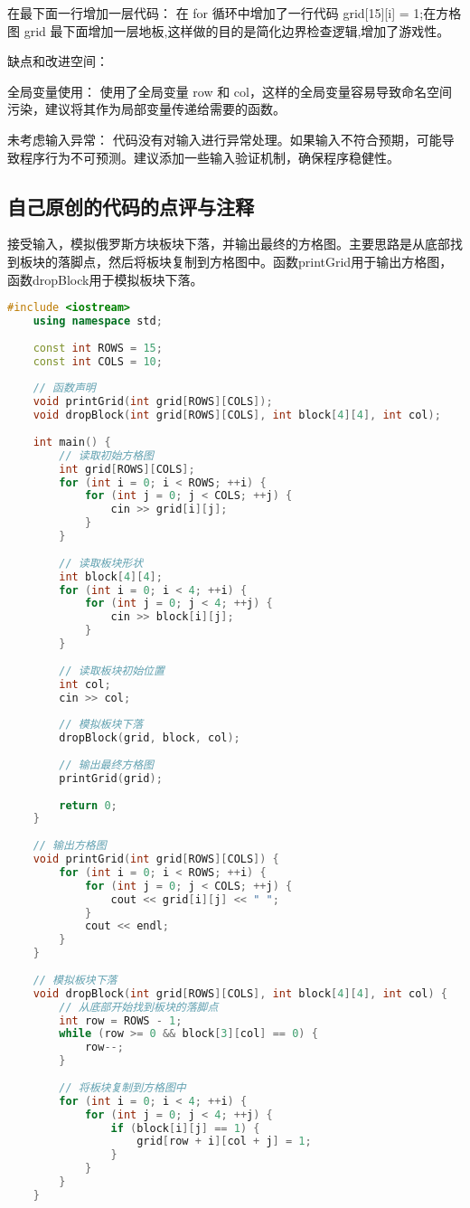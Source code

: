 在最下面一行增加一层代码： 在 for 循环中增加了一行代码 grid[15][i] = 1;在方格图 grid 最下面增加一层地板,这样做的目的是简化边界检查逻辑,增加了游戏性。

缺点和改进空间：

全局变量使用： 使用了全局变量 row 和 col，这样的全局变量容易导致命名空间污染，建议将其作为局部变量传递给需要的函数。

未考虑输入异常： 代码没有对输入进行异常处理。如果输入不符合预期，可能导致程序行为不可预测。建议添加一些输入验证机制，确保程序稳健性。

\subsection{自己原创的代码的点评与注释}

接受输入，模拟俄罗斯方块板块下落，并输出最终的方格图。主要思路是从底部找到板块的落脚点，然后将板块复制到方格图中。函数printGrid用于输出方格图，函数dropBlock用于模拟板块下落。

\begin{lstlisting}[language=C++]
    #include <iostream>
    using namespace std;
    
    const int ROWS = 15;
    const int COLS = 10;
    
    // 函数声明
    void printGrid(int grid[ROWS][COLS]);
    void dropBlock(int grid[ROWS][COLS], int block[4][4], int col);
    
    int main() {
        // 读取初始方格图
        int grid[ROWS][COLS];
        for (int i = 0; i < ROWS; ++i) {
            for (int j = 0; j < COLS; ++j) {
                cin >> grid[i][j];
            }
        }
    
        // 读取板块形状
        int block[4][4];
        for (int i = 0; i < 4; ++i) {
            for (int j = 0; j < 4; ++j) {
                cin >> block[i][j];
            }
        }
    
        // 读取板块初始位置
        int col;
        cin >> col;
    
        // 模拟板块下落
        dropBlock(grid, block, col);
    
        // 输出最终方格图
        printGrid(grid);
    
        return 0;
    }
    
    // 输出方格图
    void printGrid(int grid[ROWS][COLS]) {
        for (int i = 0; i < ROWS; ++i) {
            for (int j = 0; j < COLS; ++j) {
                cout << grid[i][j] << " ";
            }
            cout << endl;
        }
    }
    
    // 模拟板块下落
    void dropBlock(int grid[ROWS][COLS], int block[4][4], int col) {
        // 从底部开始找到板块的落脚点
        int row = ROWS - 1;
        while (row >= 0 && block[3][col] == 0) {
            row--;
        }
    
        // 将板块复制到方格图中
        for (int i = 0; i < 4; ++i) {
            for (int j = 0; j < 4; ++j) {
                if (block[i][j] == 1) {
                    grid[row + i][col + j] = 1;
                }
            }
        }
    }    
\end{lstlisting}

